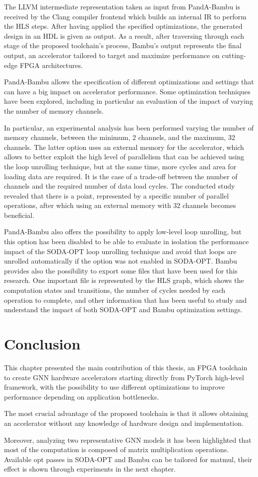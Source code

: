 The LLVM intermediate representation taken as input from PandA-Bambu is received by the Clang compiler frontend which builds an internal IR to perform the HLS steps.
After having applied the specified optimizations, the generated design in an HDL is given as output.
As a result, after traversing through each stage of the proposed toolchain's process, Bambu's output represents the final output, an accelerator tailored to target and maximize performance on cutting-edge FPGA architectures.

PandA-Bambu allows the specification of different optimizations and settings that can have a big impact on accelerator performance.
Some optimization techniques have been explored, including in particular an evaluation of the impact of varying the number of memory channels.

In particular, an experimental analysis has been performed varying the number of memory channels, between the minimum, 2 channels, and the maximum, 32 channels.
The latter option uses an external memory for the accelerator, which allows to better exploit the high level of parallelism that can be achieved using the loop unrolling technique, but at the same time, more cycles and area for loading data are required.
It is the case of a trade-off between the number of channels and the required number of data load cycles.
The conducted study revealed that there is a point, represented by a specific number of parallel operations, after which using an external memory with 32 channels becomes beneficial.

PandA-Bambu also offers the possibility to apply low-level loop unrolling, but this option has been disabled to be able to evaluate in isolation the performance impact of the SODA-OPT loop unrolling technique and avoid that loops are unrolled automatically if the option was not enabled in SODA-OPT\@.
Bambu provides also the possibility to export some files that have been used for this research.
One important file is represented by the HLS graph, which shows the computation states and transitions, the number of cycles needed by each operation to complete, and other information that has been useful to study and understand the impact of both SODA-OPT and Bambu optimization settings.

\section{Conclusion}
\label{sec:toolchain-discussion}%

This chapter presented the main contribution of this thesis, an FPGA toolchain to create GNN hardware accelerators starting directly from PyTorch high-level framework, with the possibility to use different optimizations to improve performance depending on application bottlenecks.

The most crucial advantage of the proposed toolchain is that it allows obtaining an accelerator without any knowledge of hardware design and implementation.

Moreover, analyzing two representative GNN models it has been highlighted that most of the computation is composed of matrix multiplication operations.
Available opt passes in SODA-OPT and Bambu can be tailored for matmul, their effect is shown through experiments in the next chapter.